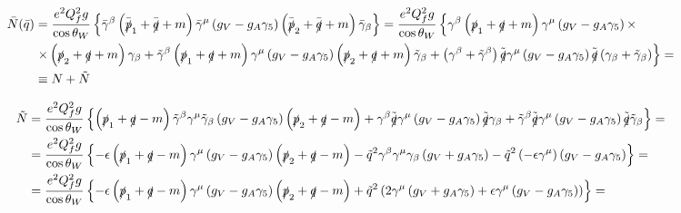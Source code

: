 \begin{align*}
\bar{N} (\bar{q}) & = \frac{e^2Q_f^2g}{\cos\theta_W} \left\lbrace \bar{\gamma}^{\beta} \left( \bar{\slashed{p}}_1 + \bar{\slashed{q}} + m \right) \bar{\gamma}^{\mu} \left( g_V - g_A \gamma_5 \right) \left( \bar{\slashed{p}}_2 + \bar{\slashed{q}} + m \right) \bar{\gamma}_{\beta} \right\rbrace = \frac{e^2Q_f^2g}{\cos\theta_W} \left\lbrace \gamma^{\beta} \left( \slashed{p}_1 + \slashed{q} + m \right) \gamma^{\mu} \left( g_V - g_A \gamma_5 \right) \times \right. & \\
& \left. \times \left( \slashed{p}_2 + \slashed{q} + m \right) \gamma_{\beta} + \tilde{\gamma}^{\beta} \left( \slashed{p}_1 + \slashed{q} + m \right) \gamma^{\mu} \left( g_V - g_A \gamma_5 \right) \left( \slashed{p}_2 + \slashed{q} + m \right) \tilde{\gamma}_{\beta} + \left( \gamma^{\beta} + \tilde{\gamma}^{\beta} \right) \tilde{\slashed{q}} \gamma^{\mu} \left( g_V - g_A \gamma_5 \right) \tilde{\slashed{q}} \left( \gamma_{\beta} + \tilde{\gamma}_{\beta} \right) \right\rbrace = & \\
& \equiv N + \tilde{N} &
\end{align*}

\begin{align*}
\tilde{N} & = \frac{e^2Q_f^2g}{\cos\theta_W} \left\lbrace \left( \slashed{p}_1 + \slashed{q} - m \right) \tilde{\gamma}^{\beta} \gamma^{\mu} \tilde{\gamma}_{\beta} \left( g_V - g_A \gamma_5 \right) \left( \slashed{p}_2 + \slashed{q} - m \right) + \gamma^{\beta} \tilde{\slashed{q}} \gamma^{\mu} \left( g_V - g_A \gamma_5 \right) \tilde{\slashed{q}} \gamma_{\beta} + \tilde{\gamma}^{\beta} \tilde{\slashed{q}} \gamma^{\mu} \left( g_V - g_A \gamma_5 \right) \tilde{\slashed{q}} \tilde{\gamma}_{\beta}   \right\rbrace = & \\
& = \frac{e^2Q_f^2g}{\cos\theta_W} \left\lbrace -\epsilon \left( \slashed{p}_1 + \slashed{q} - m \right) \gamma^{\mu} \left( g_V - g_A \gamma_5 \right) \left( \slashed{p}_2 + \slashed{q} - m \right) - \tilde{q}^2 \gamma^{\beta}\gamma^{\mu}\gamma_{\beta} \left( g_V + g_A \gamma_5 \right) - \tilde{q}^2 \left( -\epsilon \gamma^{\mu} \right) \left( g_V - g_A \gamma_5 \right) \right\rbrace = & \\
& = \frac{e^2Q_f^2g}{\cos\theta_W} \left\lbrace -\epsilon \left( \slashed{p}_1 + \slashed{q} - m \right) \gamma^{\mu} \left( g_V - g_A \gamma_5 \right) \left( \slashed{p}_2 + \slashed{q} - m \right) + \tilde{q}^2 \left( 2 \gamma^{\mu} \left( g_V + g_A \gamma_5 \right) + \epsilon \gamma^{\mu} \left( g_V - g_A \gamma_5 \right) \right) \right\rbrace = &
\end{align*}

